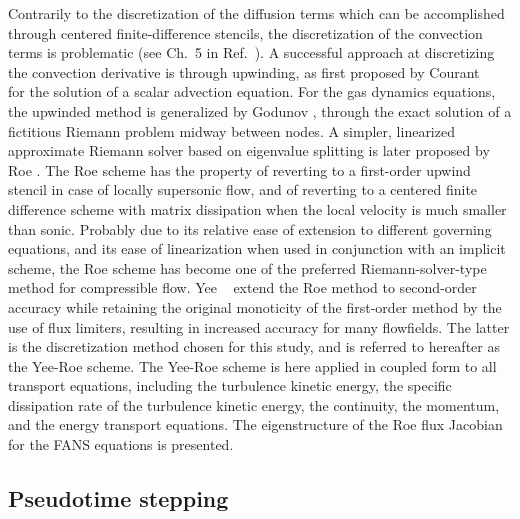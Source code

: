 Contrarily to the discretization of the diffusion terms which can
be accomplished through centered finite-difference stencils, the
discretization of the convection terms is problematic
(see Ch.~5 in Ref.~\cite{book:1980:patankar}).
A successful approach at discretizing the convection derivative is
through upwinding, as first proposed by Courant \etal\ \cite{misc:1952:courant}
for the solution of a scalar advection equation.
For the gas dynamics equations, the upwinded method is generalized by
Godunov \cite{misc:1959:godunov}, through the exact solution of a fictitious
Riemann problem midway between nodes. A simpler, linearized approximate Riemann
solver based on eigenvalue splitting is later proposed by
Roe \cite{jcp:1981:roe}. The Roe scheme has
the property of reverting to a first-order upwind stencil in case of locally
supersonic flow, and of reverting to a centered finite difference scheme with
matrix dissipation when the local velocity is much smaller than sonic.
Probably due to its relative
ease of extension to different governing equations, and its ease of linearization
when used in conjunction with an implicit scheme, the Roe scheme has
become one of the preferred Riemann-solver-type method
for compressible flow. Yee \etal\ \cite{jcp:1990:yee} extend the Roe method to
second-order accuracy
while retaining the original monoticity of the first-order method by the use
of flux limiters, resulting in increased accuracy for many flowfields. The
latter is the discretization method chosen for this study, and is
referred to hereafter as the Yee-Roe scheme. The Yee-Roe
scheme is here applied in coupled form to all transport equations, including the turbulence
kinetic energy, the specific dissipation rate of the turbulence kinetic energy,
the continuity, the momentum, and the energy
transport equations. The eigenstructure of the Roe flux Jacobian for the FANS
equations is presented.


\subsection{Pseudotime stepping}

